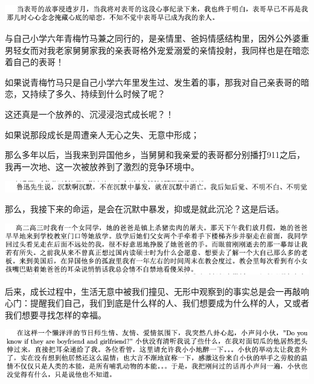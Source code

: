 \documentclass[9pt, b5paper]{article}
\begin{document}
\begin{center}
\includegraphics[width=.9\linewidth]{./pic/backups_plans_20210422_112152.png}
\end{center}

与自己小学六年青梅竹马兼之同行的，是亲情里、爸妈情感结构里，因外公外婆重男轻女而对我老家舅舅家我的亲表哥格外宠爱溺爱的亲情投射，我同样也是在暗恋着自己的表哥！

如果说青梅竹马只是自己小学六年里发生过、发生着的事，那我对自己亲表哥的暗恋，又持续了多久、持续到什么时候了呢？

这还真是一个放养的、沉浸浸泡式成长呢？！

如果说那段成长是周遭亲人无心之失、无意中形成；

那么多年以后，当我来到异国他乡，当舅舅和我亲爱的表哥都分别播打911之后，我再一次地、这一次被放养到了激烈的竞争环境中。

\begin{center}
\includegraphics[width=.9\linewidth]{./pic/backups_plans_20210422_121139.png}
\end{center}

那么，我接下来的命运，是会在沉默中暴发，抑或是就此沉沦？这是后话。

\begin{center}
\includegraphics[width=.9\linewidth]{./pic/backups_plans_20210422_120028.png}
\end{center}

后来，成长过程中，生活无意中被我们撞见、无形中观察到的事实总是会一再敲响心门：提醒我们自己，我们到底是什么样的人、我们想要成为什么样的人，又或者我们想要寻找怎样的幸福。 

\begin{center}
\includegraphics[width=.9\linewidth]{./pic/backups_plans_20210422_114817.png}
\end{center}
\end{document}
